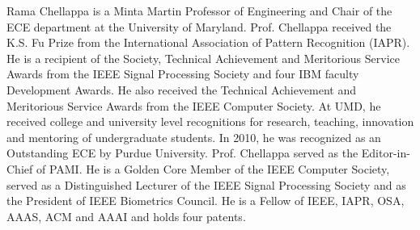 \documentclass[10pt,journal,compsoc]{IEEEtran}
\begin{document}
\vspace{-20pt}
\begin{IEEEbiography}{Rama Chellappa}
is a Minta Martin Professor of Engineering and Chair of the ECE department at the University of Maryland. Prof. Chellappa received the K.S. Fu Prize from the International Association of Pattern Recognition (IAPR). He is a recipient of the Society, Technical Achievement and Meritorious Service Awards from the IEEE Signal Processing Society and four IBM faculty Development Awards. He also received the Technical Achievement and Meritorious Service Awards from the IEEE Computer Society. At UMD, he received college and university level recognitions for research, teaching, innovation and mentoring of undergraduate students. In 2010, he was recognized as an Outstanding ECE by Purdue University. Prof. Chellappa served as the Editor-in-Chief of PAMI. He is a Golden Core Member of the IEEE Computer Society, served as a Distinguished Lecturer of the IEEE Signal Processing Society and as the President of IEEE Biometrics Council. He is a Fellow of IEEE, IAPR, OSA, AAAS, ACM and AAAI and holds four patents.
\end{IEEEbiography}
\end{document}
